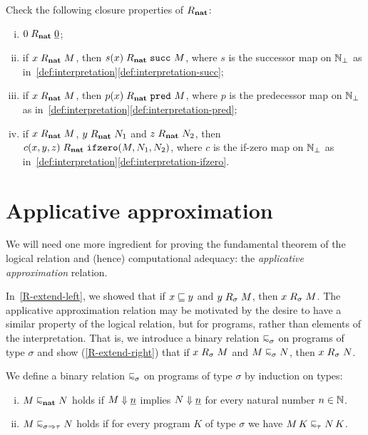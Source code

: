 \begin{exercise}\label{exer:closure-under-basic-operations}
  Check the following closure properties of \(\mathrel{R}_\mathtt{\mathbf{nat}}\):
  \begin{enumerate}[(i)]
  \item \(0 \mathrel{R}_\mathtt{\mathbf{nat}} \underline{0}\);
  \item if \(x \mathrel{R}_\mathtt{\mathbf{nat}} M\), then \(s(x) \mathrel{R}_\mathtt{\mathbf{nat}} \operatorname{\mathtt{succ}}\, M\),
    where \(s\) is the successor map on \(\mathbb N_\bot\) as
    in~\cref{def:interpretation}\ref{def:interpretation-succ};
  \item if \(x \mathrel{R}_\mathtt{\mathbf{nat}} M\), then \(p(x) \mathrel{R}_\mathtt{\mathbf{nat}} \operatorname{\mathtt{pred}}\, M\),
    where \(p\) is the predecessor map on \(\mathbb N_\bot\) as
    in~\cref{def:interpretation}\ref{def:interpretation-pred};
  \item if \(x \mathrel{R}_\mathtt{\mathbf{nat}} M\), \(y \mathrel{R}_\mathtt{\mathbf{nat}} N_1\) and
    \(z \mathrel{R}_\mathtt{\mathbf{nat}} N_2\), then
    \(c(x,y,z) \mathrel{R}_\mathtt{\mathbf{nat}} \operatorname{\mathtt{ifzero}}(M,N_1,N_2)\), where \(c\) is the if-zero
    map on \(\mathbb N_\bot\) as
    in~\cref{def:interpretation}\ref{def:interpretation-ifzero}.
  \end{enumerate}
\end{exercise}

\section{Applicative approximation}

We will need one more ingredient for proving the fundamental theorem of the
logical relation and (hence) computational adequacy: the \emph{applicative
  approximation} relation.

In~\cref{R-extend-left}, we showed that if \(x \sqsubseteq y\) and
\(y \mathrel{R}_\sigma M\), then \(x \mathrel{R}_\sigma M\).
%
The applicative approximation relation may be motivated by the desire to have a
similar property of the logical relation, but for programs, rather than elements
of the interpretation. That is, we introduce a binary relation
\(\appapprox_\sigma\) on programs of type \(\sigma\) and show
(\cref{R-extend-right}) that if \(x \mathrel{R}_\sigma M\) and
\(M \appapprox_\sigma N\), then \(x \mathrel{R}_\sigma N\).

\begin{definition}
  We define a binary relation \(\appapprox_\sigma\) on programs of type
  \(\sigma\) by induction on types:
  \begin{enumerate}[(i)]
  \item \(M \appapprox_\pcfnat N\) holds if \(M \Downarrow \underline{n}\) implies
    \(N \Downarrow \underline{n}\) for every natural number \(n\in\mathbb N\).
  \item \(M \appapprox_{\sigma \pcffun \tau} N\) holds if for every program
    \(K\) of type \(\sigma\) we have \(M \, K \appapprox_\tau N \, K\).
  \end{enumerate}
\end{definition}

